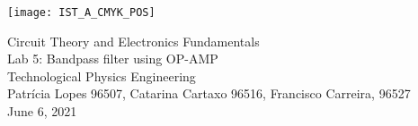 
\thispagestyle {empty}


\begin{center}
    \texttt{[image: IST\_A\_CMYK\_POS]}
\end{center}


\begin{center}


{\FontLb \Huge Circuit Theory and Electronics Fundamentals} \\ %
\vspace{0.8cm}
{\FontSn \LARGE Lab 5: Bandpass filter using OP-AMP} \\
\vspace{0.5cm}
{\FontSn Technological Physics Engineering} \\ %
\vspace{0.5cm}
{\FontSn \normalsize Patrícia Lopes 96507, Catarina Cartaxo 96516, Francisco Carreira, 96527} \\
\vspace{0.3cm}
{\FontSn \small June 6, 2021} \\ %
\vspace{1cm}
\end{center}

